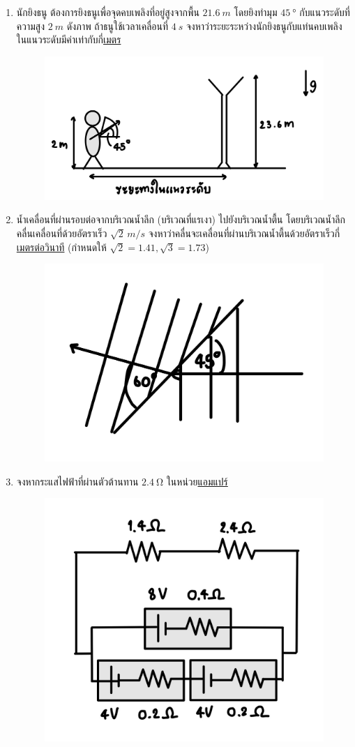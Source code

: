 \documentclass[a4paper,12pt]{article}
\begin{document}
\begin{enumerate}
		\item นักยิงธนู ต้องการยิงธนูเพื่อจุดคบเพลิงที่อยู่สูงจากพื้น \(\SI{21.6}{m}\) โดยยิงทำมุม \(\SI{45}{\degree}\) กับแนวระดับที่ความสูง \(\SI{2}{m}\) ดังภาพ
		ถ้าธนูใช้เวลาเคลื่อนที่ \(\SI{4}{s}\) จงหาว่าระยะระหว่างนักยิงธนูกับแท่นคบเพลิงในแนวระดับมีค่าเท่ากับกี่\underline{เมตร}
		\begin{figure}[h]
			\centering
			\includegraphics[width=0.5\linewidth]{28}
		\end{figure}
			\vspace{2cm}
		
		\item น้ำเคลื่อนที่ผ่านรอบต่อจากบริเวณน้ำลึก (บริเวณที่แรเงา\textenglish{)} ไปยังบริเวณน้ำตื้น โดยบริเวณน้ำลึกคลื่นเคลื่อนที่ด้วยอัตราเร็ว \(\sqrt{2}\,\si{m/s}\) จงหาว่าคลื่นจะเคลื่อนที่ผ่านบริเวณน้ำตื้นด้วยอัตราเร็วกี่\underline{เมตรต่อวินาที} (กำหนดให้ \(\sqrt{2}=1.41,\sqrt{3}=1.73\))
		\begin{figure}[h]
			\centering
			\includegraphics[width=0.3\linewidth]{29}
		\end{figure}
			\vspace{2cm}
		
		\item จงหากระแสไฟฟ้าที่ผ่านตัวต้านทาน \(\SI{2.4}{\ohm}\) ในหน่วย\underline{แอมแปร์}
		\begin{figure}[h]
			\centering
			\includegraphics[width=0.3\linewidth]{30}
		\end{figure}
			\vspace{4cm}
\end{enumerate}
\end{document}
